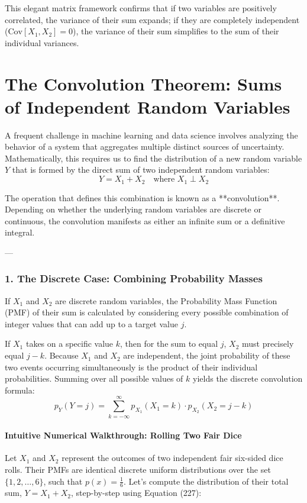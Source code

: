 \documentclass{article}
\begin{document}
This elegant matrix framework confirms that if two variables are positively correlated, the variance of their sum expands; if they are completely independent ($\text{Cov}[X_1,X_2]=0$), the variance of their sum simplifies to the sum of their individual variances.

\section*{The Convolution Theorem: Sums of Independent Random Variables}

A frequent challenge in machine learning and data science involves analyzing the behavior of a system that aggregates multiple distinct sources of uncertainty. Mathematically, this requires us to find the distribution of a new random variable $Y$ that is formed by the direct sum of two independent random variables:
\begin{equation*}
Y = X_1 + X_2 \quad \text{where } X_1 \perp X_2
\end{equation*}

The operation that defines this combination is known as a **convolution**. Depending on whether the underlying random variables are discrete or continuous, the convolution manifests as either an infinite sum or a definitive integral.

---

\subsubsection*{1. The Discrete Case: Combining Probability Masses}

If $X_1$ and $X_2$ are discrete random variables, the Probability Mass Function (PMF) of their sum is calculated by considering every possible combination of integer values that can add up to a target value $j$. 

If $X_1$ takes on a specific value $k$, then for the sum to equal $j$, $X_2$ must precisely equal $j - k$. Because $X_1$ and $X_2$ are independent, the joint probability of these two events occurring simultaneously is the product of their individual probabilities. Summing over all possible values of $k$ yields the discrete convolution formula:
\begin{equation}
p_Y(Y = j) = \sum_{k=-\infty}^{\infty} p_{X_1}(X_1 = k) \cdot p_{X_2}(X_2 = j - k) \tag{227}
\end{equation}

\paragraph{Intuitive Numerical Walkthrough: Rolling Two Fair Dice}
Let $X_1$ and $X_2$ represent the outcomes of two independent fair six-sided dice rolls. Their PMFs are identical discrete uniform distributions over the set $\{1, 2, \dots, 6\}$, such that $p(x) = \frac{1}{6}$. Let's compute the distribution of their total sum, $Y = X_1 + X_2$, step-by-step using Equation (227):
\end{document}
